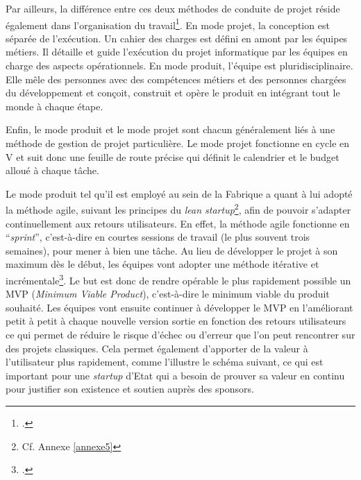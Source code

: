 Par ailleurs, la différence entre ces deux méthodes de conduite de projet réside également dans l’organisation du travail\footcite[p.21]{betagouv_guide_2024}. En mode projet, la conception est séparée de l’exécution. Un cahier des charges est défini en amont par les équipes métiers. Il détaille et guide l’exécution du projet informatique par les équipes en charge des aspects opérationnels. En mode produit, l’équipe est pluridisciplinaire. Elle mêle des personnes avec des compétences métiers et des personnes chargées du développement et conçoit, construit et opère le produit en intégrant tout le monde à chaque étape.


Enfin, le mode produit et le mode projet sont chacun généralement liés à une méthode de gestion de projet particulière. Le mode projet fonctionne en cycle en V et suit donc une feuille de route précise qui définit le calendrier et le budget alloué à chaque tâche.

\clearpage




Le mode produit tel qu’il est employé au sein de la Fabrique a quant à lui adopté la méthode \gls{agile}, suivant les principes du \textit{lean startup}\footnote{Cf. Annexe \ref{annexe5}}, afin de pouvoir s’adapter continuellement aux retours utilisateurs. En effet, la méthode \gls{agile} fonctionne en \enquote{\textit{sprint}}, c’est-à-dire en courtes sessions de travail (le plus souvent trois semaines), pour mener à bien une tâche. Au lieu de développer le projet à son maximum dès le début, les équipes vont adopter une méthode itérative et incrémentale\footcite{adam_agile_nodate}. Le but est donc de rendre opérable le plus rapidement possible un \gls{MVP} (\textit{Minimum Viable Product}), c’est-à-dire le minimum viable du produit souhaité. Les équipes vont ensuite continuer à développer le \gls{MVP} en l’améliorant petit à petit à chaque nouvelle version sortie en fonction des retours utilisateurs ce qui permet de réduire le risque d'échec ou d'erreur que l'on peut rencontrer sur des projets classiques. Cela permet également d'apporter de la valeur à l'utilisateur plus rapidement, comme l'illustre le schéma suivant, ce qui est important pour une \textit{startup} d'Etat qui a besoin de prouver sa valeur en continu pour justifier son existence et soutien auprès des sponsors.

\clearpage

